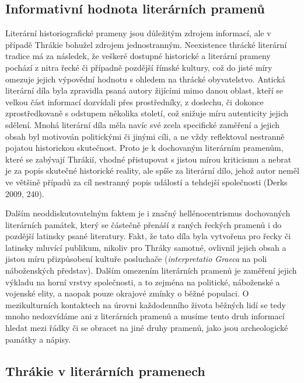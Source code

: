 \subsection[informativní-hodnota-literárních-pramenů]{Informativní hodnota literárních pramenů}

Literární historiografické prameny jsou důležitým zdrojem informací, ale v případě Thrákie bohužel zdrojem jednostranným. Neexistence thrácké literární tradice má za následek, že veškeré dostupné historické a literární prameny pochází z nitra řecké či případně pozdější římské kultury, což do jisté míry omezuje jejich výpovědní hodnotu s ohledem na thrácké obyvatelstvo. Antická literární díla byla zpravidla psaná autory žijícími mimo danou oblast, kteří se velkou část informací dozvídali přes prostředníky, z doslechu, či dokonce zprostředkovaně s odstupem několika století, což snižuje míru autenticity jejich sdělení. Mnohá literární díla měla navíc své zcela specifické zaměření a jejich obsah byl motivován politickými či jinými cíli, a ne vždy reflektoval nestranně pojatou historickou skutečnost. Proto je k dochovaným literárním pramenům, které se zabývají Thrákií, vhodné přistupovat s jistou mírou kriticismu a nebrat je za popis skutečné historické reality, ale spíše za literární dílo, jehož autor neměl ve většině případů za cíl nestranný popis událostí a tehdejší společnosti (Derks 2009, 240).

Dalším neoddiskutovatelným faktem je i značný hellénocentrismus dochovaných literárních památek, který se částečně přenáší z raných řeckých pramenů i do pozdější latinsky psané literatury. Fakt, že tato díla byla vytvořena pro řecky či latinsky mluvící publikum, nikoliv pro Thráky samotné, ovlivnil jejich obsah a jistou míru přizpůsobení kultuře posluchače ({\em interpretatio Graeca} na poli náboženských představ). Dalším omezením literárních pramenů je zaměření jejich výkladu na horní vrstvy společnosti, a to zejména na politické, náboženské a vojenské elity, a naopak pouze okrajové zmínky o běžné populaci. O mezikulturních kontaktech na úrovni každodenního života běžných lidí se tedy mnoho nedozvídáme ani z literárních pramenů a musíme tento druh informací hledat mezi řádky či se obracet na jiné druhy pramenů, jako jsou archeologické památky a nápisy.

\subsection[thrákie-v-literárních-pramenech]{Thrákie v literárních pramenech}

